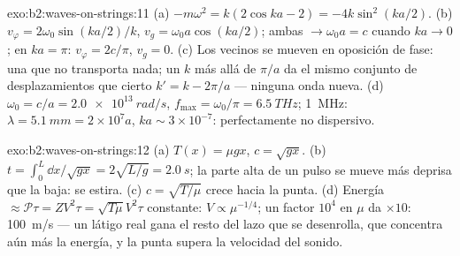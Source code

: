 \begin{solution}{exo:b2:waves-on-strings:11}
(a) $-m\omega^2 = k(2\cos ka - 2) = -4k\sin^2(ka/2)$. (b) $v_\varphi = 2\omega_0\sin(ka/2)
/k$, $v_g = \omega_0a\cos(ka/2)$; ambas $\to \omega_0a = c$ cuando $ka \to 0$; en $ka = \pi$:
$v_\varphi = 2c/\pi$, $v_g = 0$. (c) Los vecinos se mueven en oposición de fase: una 
que no transporta nada; un $k$ más allá de $\pi/a$ da el mismo conjunto de
desplazamientos que cierto $k' = k - 2\pi/a$ --- ninguna onda nueva. (d) $\omega_0 = c/a =
\qty{2.0e13}{rad/s}$, $f_{\max} = \omega_0/\pi = \qty{6.5}{THz}$; \qty{1}{MHz}: $\lambda =
\qty{5.1}{mm} = 2 \times 10^7a$, $ka \sim 3 \times 10^{-7}$: perfectamente no dispersivo.
\end{solution}

\begin{solution}{exo:b2:waves-on-strings:12}
(a) $T(x) = \mu gx$, $c = \sqrt{gx}$. (b) $t = \int_0^L\dd x/\sqrt{gx} = 2\sqrt{L/g} =
\qty{2.0}{s}$; la parte alta de un pulso se mueve más deprisa que la baja:
se estira. (c) $c = \sqrt{T/\mu}$ crece hacia la punta. (d) Energía $\approx
\mathcal P\tau = ZV^2\tau = \sqrt{T\mu}V^2\tau$ constante: $V \propto \mu^{-1/4}$; un
factor $10^4$ en $\mu$ da $\times10$: \qty{100}{m/s} --- un látigo real gana
el resto del lazo que se desenrolla, que concentra aún más la energía, y
la punta supera la velocidad del sonido.
\end{solution}

